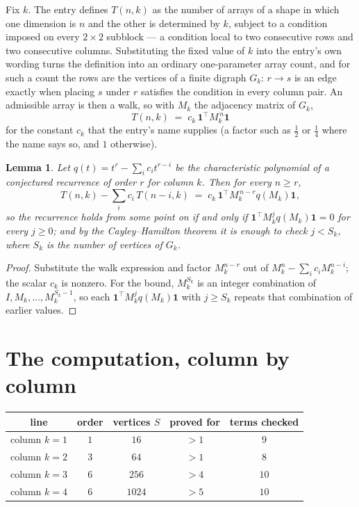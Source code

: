 \documentclass[11pt,a4paper]{article}
\theoremstyle{plain}
\newtheorem{lemma}[theorem]{Lemma}
\theoremstyle{definition}
\begin{document}
Fix $k$. The entry defines $T(n,k)$ as the number of arrays of a shape in which one dimension
is $n$ and the other is determined by $k$, subject to a condition imposed on every
$2\times2$ subblock --- a condition local to two consecutive rows and two consecutive columns.
Substituting the fixed value of $k$ into the entry's own wording turns the definition into an
ordinary one-parameter array count, and for such a count the rows are the vertices of a finite
digraph $G_k$: $r\to s$ is an edge exactly when placing $s$ under $r$ satisfies the condition
in every column pair. An admissible array is then a walk, so with $M_k$ the adjacency matrix
of $G_k$,
\[
T(n,k)\;=\;c_k\,\mathbf{1}^{\!\top}M_k^{\,n}\mathbf{1}
\]
for the constant $c_k$ that the entry's name supplies (a factor such as $\tfrac12$ or
$\tfrac14$ where the name says so, and $1$ otherwise).

\begin{lemma}\label{lem:crit}
Let $q(t)=t^{r}-\sum_i c_it^{r-i}$ be the characteristic polynomial of a conjectured
recurrence of order $r$ for column $k$. Then for every $n\ge r$,
\[
T(n,k)-\sum_i c_i\,T(n-i,k)\;=\;c_k\,\mathbf{1}^{\!\top}M_k^{\,n-r}q(M_k)\mathbf{1},
\]
so the recurrence holds from some point on if and only if
$\mathbf{1}^{\!\top}M_k^{j}q(M_k)\mathbf{1}=0$ for every $j\ge0$; and by the
Cayley--Hamilton theorem it is enough to check $j<S_k$, where $S_k$ is the number of vertices
of $G_k$.
\end{lemma}

\begin{proof}
Substitute the walk expression and factor $M_k^{n-r}$ out of $M_k^{n}-\sum_ic_iM_k^{n-i}$;
the scalar $c_k$ is nonzero. For the bound, $M_k^{S_k}$ is an integer combination of
$I,M_k,\dots,M_k^{S_k-1}$, so each $\mathbf{1}^{\!\top}M_k^{j}q(M_k)\mathbf{1}$ with
$j\ge S_k$ repeats that combination of earlier values.
\end{proof}

\section{The computation, column by column}

\begin{center}
\begin{tabular}{ccccc}
line & order & vertices $S$ & proved for & terms checked \\ \hline
column $k$$=1$ & $1$ & $16$ & $>1$ & $9$ \\
column $k$$=2$ & $3$ & $64$ & $>1$ & $8$ \\
column $k$$=3$ & $6$ & $256$ & $>4$ & $10$ \\
column $k$$=4$ & $6$ & $1024$ & $>5$ & $10$ \\
\end{tabular}
\end{center}
\end{document}
